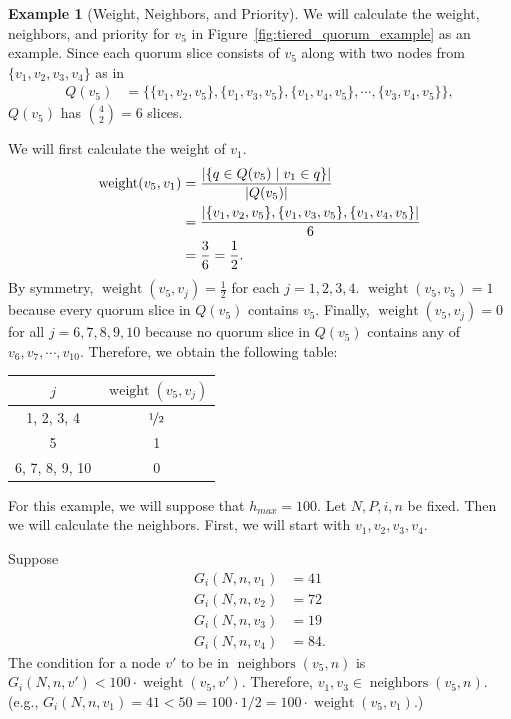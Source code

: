 \documentclass[12pt, psamsfonts]{amsart}
\theoremstyle{definition}
\newtheorem{exmp}[thm]{Example}
\theoremstyle{remark}
\DeclareMathOperator{\weight}{weight}
\DeclareMathOperator{\neighbors}{neighbors}
\numberwithin{equation}{subsection}
\begin{document}
\begin{exmp}[Weight, Neighbors, and Priority]
    We will calculate the weight, neighbors, and priority for $v_5$ in Figure~\ref{fig:tiered_quorum_example} as an example.
    Since each quorum slice consists of $v_5$ along with two nodes from $\{ v_1, v_2, v_3, v_4 \}$ as in
    \begin{align*}
        Q(v_5) &= \{ \{ v_1, v_2, v_5 \}, \{ v_1, v_3, v_5 \}, \{ v_1, v_4, v_5 \}, \cdots, \{ v_3, v_4, v_5 \} \},
    \end{align*}
    $Q(v_5)$ has $\binom{4}{2} = 6$ slices.

    We will first calculate the weight of $v_1$.
    \begin{align*}
        \weight(v_5, v_1)
            &= \frac{\abs{\{ q \in Q(v_5) \mid v_1 \in q \}}}{\abs{Q(v_5)}} \\
            &= \frac{\abs{ \{ v_1, v_2, v_5 \}, \{ v_1, v_3, v_5 \}, \{ v_1, v_4, v_5 \}}}{6} \\
            &= \frac{3}{6} = \frac{1}{2}.
    \end{align*}
    By symmetry, $\weight(v_5, v_j) = \frac{1}{2}$ for each $j = 1, 2, 3, 4$.
    $\weight(v_5, v_5) = 1$ because every quorum slice in $Q(v_5)$ contains $v_5$.
    Finally, $\weight(v_5, v_j) = 0$ for all $j = 6, 7, 8, 9, 10$ because no quorum slice in $Q(v_5)$ contains any of $v_6, v_7, \cdots, v_{10}$.
    Therefore, we obtain the following table:
    \begin{center}
      \begin{tabular}{ | c | c | }
        \hline
          $j$ & $\weight(v_5, v_j)$ \\ \hline
          1, 2, 3, 4 & $\nicefrac{1}{2}$ \\ \hline 
          5 & 1 \\ \hline 
          6, 7, 8, 9, 10 & 0 \\
        \hline
      \end{tabular}
    \end{center}

    For this example, we will suppose that $h_{max} = 100$.
    Let $N, P, i, n$ be fixed.
    Then we will calculate the neighbors.
    First, we will start with $v_1, v_2, v_3, v_4$.

    Suppose
    \begin{align*}
        G_i(N, n, v_1) &= 41 \\
        G_i(N, n, v_2) &= 72 \\
        G_i(N, n, v_3) &= 19 \\
        G_i(N, n, v_4) &= 84.
    \end{align*}
    The condition for a node $v'$ to be in $\neighbors(v_5, n)$ is $G_i(N, n, v') < 100 \cdot \weight(v_5, v')$.
    Therefore, $v_1, v_3 \in \neighbors(v_5, n)$.
    (e.g., $G_i(N, n, v_1) = 41 < 50 = 100 \cdot 1/2 = 100 \cdot \weight(v_5, v_1)$.)


\end{exmp}
\end{document}
